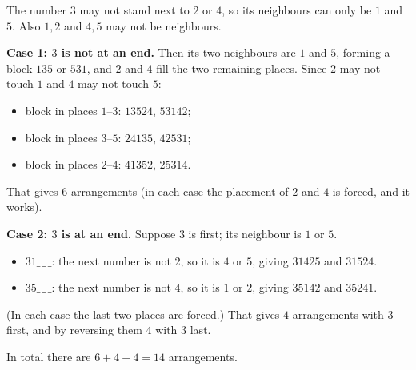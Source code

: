 The number $3$ may not stand next to $2$ or $4$, so its neighbours can only be $1$ and $5$. Also $1,2$ and $4,5$ may not be neighbours.

\textbf{Case 1: $3$ is not at an end.} Then its two neighbours are $1$ and $5$, forming a block $135$ or $531$, and $2$ and $4$ fill the two remaining places. Since $2$ may not touch $1$ and $4$ may not touch $5$:
\begin{itemize}
\item block in places $1$--$3$: $13524$, $53142$;
\item block in places $3$--$5$: $24135$, $42531$;
\item block in places $2$--$4$: $41352$, $25314$.
\end{itemize}
That gives $6$ arrangements (in each case the placement of $2$ and $4$ is forced, and it works).

\textbf{Case 2: $3$ is at an end.} Suppose $3$ is first; its neighbour is $1$ or $5$.
\begin{itemize}
\item $31\_\,\_\,\_$: the next number is not $2$, so it is $4$ or $5$, giving $31425$ and $31524$.
\item $35\_\,\_\,\_$: the next number is not $4$, so it is $1$ or $2$, giving $35142$ and $35241$.
\end{itemize}
(In each case the last two places are forced.) That gives $4$ arrangements with $3$ first, and by reversing them $4$ with $3$ last.

In total there are $6+4+4=\boxed{14}$ arrangements.

